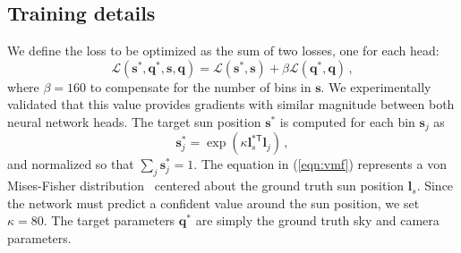 \subsection{Training details}

We define the loss to be optimized as the sum of two losses, one for each head: 
%
\begin{equation}
\mathcal{L}(\mathbf{s}^*, \mathbf{q}^*, \mathbf{s}, \mathbf{q}) = \mathcal{L}(\mathbf{s}^*, \mathbf{s}) + \beta \mathcal{L}(\mathbf{q}^*, \mathbf{q}) \,,
\label{eqn:ch3_loss}
\end{equation}
%
where $\beta = 160$ to compensate for the number of bins in $\mathbf{s}$. We experimentally validated that this value provides gradients with similar magnitude between both neural network heads. The target sun position $\mathbf{s}^*$ is computed for each bin $\mathbf{s}_j$ as 
%
\begin{equation}
\mathbf{s}^*_j = \exp(\kappa \mathbf{l}_s^{*\mathsf{T}} \mathbf{l}_j) \,,
\label{eqn:vmf}
\end{equation}
%
and normalized so that $\sum_j \mathbf{s}^*_j = 1$. The equation in (\ref{eqn:vmf}) represents a von Mises-Fisher distribution~\cite{banerjee-jmlr-05} centered about the ground truth sun position $\mathbf{l}_s$. Since the network must predict a confident value around the sun position, we set $\kappa = 80$. The target parameters $\mathbf{q}^*$ are simply the ground truth sky and camera parameters. 

